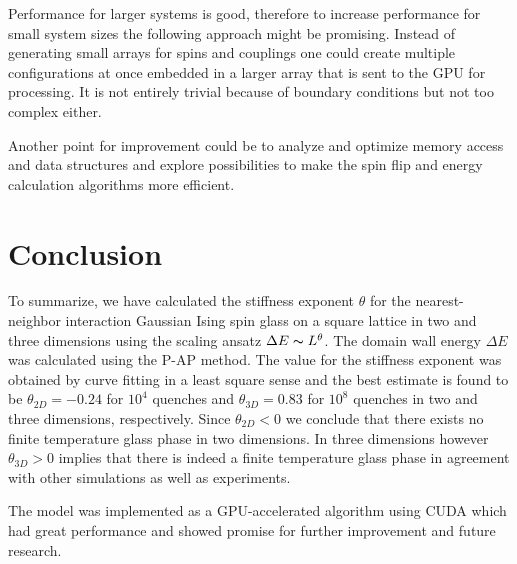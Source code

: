 \documentclass[paper=a4, fontsize=11pt]{scrartcl} %
\numberwithin{equation}{section} %
\numberwithin{figure}{section} %
\numberwithin{table}{section} %
\begin{document}
Performance for larger systems is good, therefore to increase performance for small system sizes the following approach might be promising. Instead of generating small arrays for spins and couplings one could create multiple configurations at once embedded in a larger array that is sent to the GPU for processing. It is not entirely trivial because of boundary conditions but not too complex either.

Another point for improvement could be to analyze and optimize memory access and data structures and explore possibilities to make the spin flip and energy calculation algorithms more efficient.


\section{Conclusion}
\label{sec:conclusions}
To summarize, we have calculated the stiffness exponent $\theta$ for the nearest-neighbor interaction Gaussian Ising spin glass on a square lattice in two and three dimensions using the scaling ansatz $\Delta E \thicksim L^\theta$. The domain wall energy $\Delta E$ was calculated using the P-AP method. The value for the stiffness exponent was obtained by curve fitting in a least square sense and the best estimate is found to be $\theta_{2D}=-0.24$ for $10^4$ quenches and $\theta_{3D}=0.83$ for $10^8$ quenches in two and three dimensions, respectively. Since $\theta_{2D}<0$ we conclude that there exists no finite temperature glass phase in two dimensions. In three dimensions however $\theta_{3D}>0$ implies that there is indeed a finite temperature glass phase in agreement with other simulations as well as experiments\cite{hartmann}\cite{fisher}\cite{carter}. 

The model was implemented as a GPU-accelerated algorithm using CUDA which had great performance and showed promise for further improvement and future research.
\end{document}
